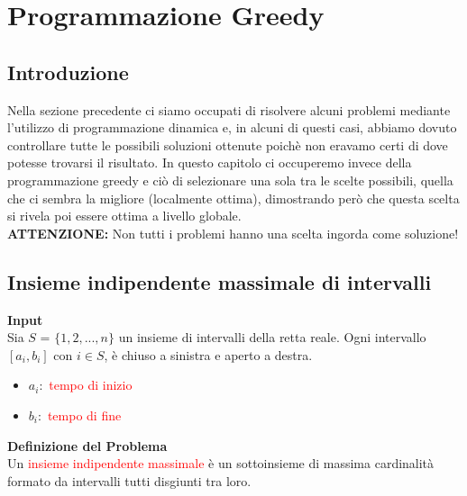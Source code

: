\documentclass[../cheatSheetAlgoritmi.tex]{subfiles}
\begin{document}
\section{Programmazione Greedy}
\subsection{Introduzione}
Nella sezione precedente ci siamo occupati di risolvere alcuni problemi mediante l'utilizzo di programmazione dinamica e, in alcuni di questi casi, abbiamo dovuto controllare tutte le possibili soluzioni ottenute poichè non eravamo certi di dove potesse trovarsi il risultato. In questo capitolo ci occuperemo invece della programmazione greedy e ciò di selezionare una sola tra le scelte possibili, quella che ci sembra la migliore (localmente ottima), dimostrando però che questa scelta si rivela poi essere ottima a livello globale.\\
\textbf{ATTENZIONE:} Non tutti i problemi hanno una scelta ingorda come soluzione!
\subsection{Insieme indipendente massimale di intervalli}
\textbf{Input}\\
Sia $S$ = $\{1, 2, ..., n\}$ un insieme di intervalli della retta reale. Ogni intervallo $[a_i, b_i]$ con $i \in S$, è chiuso a sinistra e aperto a destra.
\begin{itemize}
	\item  $a_i:$ \textcolor{red}{tempo di inizio}
	\item  $b_i:$ \textcolor{red}{tempo di fine}
\end{itemize}
\textbf{Definizione del Problema} \\
Un \textcolor{red}{insieme indipendente massimale} è un sottoinsieme di massima cardinalità formato da intervalli tutti disgiunti tra loro.
\end{document}
